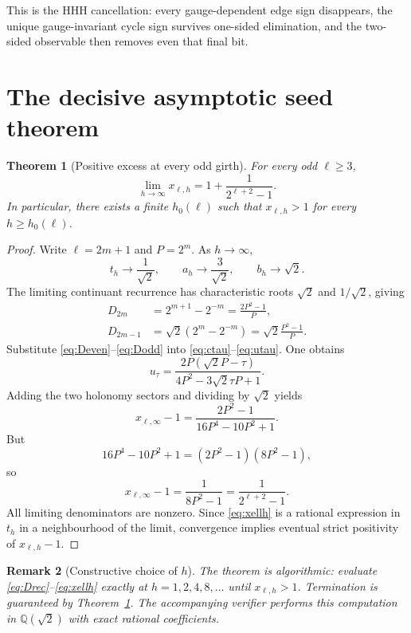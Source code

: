\documentclass[11pt]{article}
\newtheorem{theorem}{Theorem}[section]
\newtheorem{remark}[theorem]{Remark}
\begin{document}
This is the HHH cancellation: every gauge-dependent edge sign disappears, the unique gauge-invariant cycle sign survives one-sided elimination, and the two-sided observable then removes even that final bit.

\section{The decisive asymptotic seed theorem}

\begin{theorem}[Positive excess at every odd girth]\label{thm:seedlimit}
For every odd $\ell\ge3$,
\begin{equation}\label{eq:limit}
 \boxed{
 \lim_{h\to\infty}x_{\ell,h}
 =1+\frac1{2^{\ell+2}-1}.}
\end{equation}
In particular, there exists a finite $h_0(\ell)$ such that $x_{\ell,h}>1$ for every $h\ge h_0(\ell)$.
\end{theorem}

\begin{proof}
Write $\ell=2m+1$ and $P=2^m$.  As $h\to\infty$,
\[
 t_h\to\frac1{\sqrt2},\qquad
 a_h\to\frac3{\sqrt2},\qquad
 b_h\to\sqrt2.
\]
The limiting continuant recurrence has characteristic roots $\sqrt2$ and $1/\sqrt2$, giving
\begin{align}
 D_{2m}&=2^{m+1}-2^{-m}=\frac{2P^2-1}{P},\label{eq:Deven}\\
 D_{2m-1}&=\sqrt2(2^m-2^{-m})
 =\sqrt2\frac{P^2-1}{P}.\label{eq:Dodd}
\end{align}
Substitute \eqref{eq:Deven}--\eqref{eq:Dodd} into \eqref{eq:ctau}--\eqref{eq:utau}.  One obtains
\begin{equation}\label{eq:ulim}
 u_\tau
 =\frac{2P(\sqrt2P-\tau)}{4P^2-3\sqrt2\tau P+1}.
\end{equation}
Adding the two holonomy sectors and dividing by $\sqrt2$ yields
\[
 x_{\ell,\infty}-1
 =\frac{2P^2-1}{16P^4-10P^2+1}.
\]
But
\[
 16P^4-10P^2+1
 =(2P^2-1)(8P^2-1),
\]
so
\[
 x_{\ell,\infty}-1
 =\frac1{8P^2-1}
 =\frac1{2^{\ell+2}-1}.
\]
All limiting denominators are nonzero.  Since \eqref{eq:xellh} is a rational expression in $t_h$ in a neighbourhood of the limit, convergence implies eventual strict positivity of $x_{\ell,h}-1$.
\end{proof}

\begin{remark}[Constructive choice of $h$]
The theorem is algorithmic: evaluate \eqref{eq:Drec}--\eqref{eq:xellh} exactly at $h=1,2,4,8,\ldots$ until $x_{\ell,h}>1$.  Termination is guaranteed by Theorem~\ref{thm:seedlimit}.  The accompanying verifier performs this computation in $\mathbb Q(\sqrt2)$ with exact rational coefficients.
\end{remark}
\end{document}
